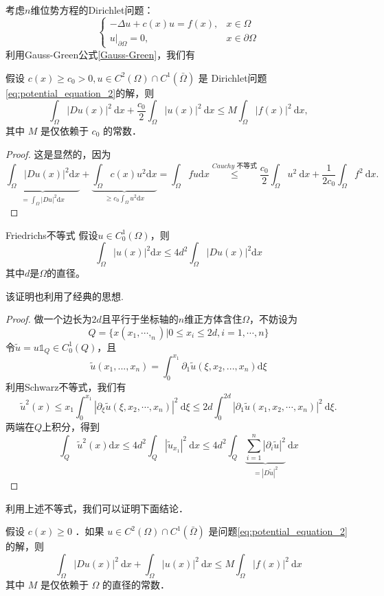 \documentclass{mynote}
\begin{document}
考虑$n$维位势方程的Dirichlet问题：
\begin{equation}\label{eq:potential_equation_2}
    \begin{cases}
        -\Delta u+c(x)u=f(x), & x\in \Omega\\
        u|_{\partial \Omega}=0, & x\in \partial \Omega
    \end{cases}
\end{equation}
利用Gauss-Green公式\ref{Gauss-Green}，我们有
\begin{theorem}
    假设 $c(x) \geq c_0>0, u \in C^2(\Omega) \cap C^1(\bar{\Omega})$ 是 Dirichlet问题\ref{eq:potential_equation_2}的解，则
$$
\int_{\Omega}|D u(x)|^2 \mathrm{~d} x+\frac{c_0}{2} \int_{\Omega}|u(x)|^2 \mathrm{~d} x \leq M \int_{\Omega}|f(x)|^2 \mathrm{~d} x,
$$
其中 $M$ 是仅依赖于 $c_0$ 的常数．
\end{theorem}
\begin{proof}
    这是显然的，因为
    \[
        \underbrace{\int_{\Omega}|Du(x)|^2\mathrm{d}x}_{=\displaystyle \int_{\Omega}|Du|^2\mathrm{d}x}+\underbrace{\int_{\Omega}c(x)u^2\mathrm{d}x}_{\displaystyle \ge c_0\int_{\Omega}u^2\mathrm{d}x}=\int_{\Omega}fu\mathrm{d}x\overset{Cauchy\text{ 不等式}}\le \frac{c_0}{2} \int_{\Omega} u^2 \mathrm{~d} x+\frac{1}{2 c_0} \int_{\Omega} f^2 \mathrm{~d} x .
    \]
\end{proof}
\begin{lemma}{Friedrichs不等式}\label{Friedrichs_inequality}
    假设$u\in C^1_0(\Omega)$，则
    \[
        \int_{\Omega}|u(x)|^2\mathrm{d}x\le 4d^2\int_\Omega|Du(x)|^2\mathrm{d}x
    \]
    其中$d$是$\Omega$的直径。
\end{lemma}
该证明也利用了经典的思想.
\begin{proof}
    做一个边长为$2d$且平行于坐标轴的$n$维正方体含住$\Omega$，不妨设为
    \[
        Q=\{x(x_1,\cdots,_n)|0\le x_i\le 2d,i=1,\cdots,n\}
    \]
    令$\tilde{u}=u \mathbb{1}_{Q}\in C_0^1(Q)$，且
    \[
        \tilde{u}(x_1,...,x_n)=\int_0^{x_1}\partial_{1}\tilde{u}(\xi,x_2,...,x_n)\mathrm{d}\xi
    \]
    利用Schwarz不等式，我们有
    \[
        \tilde{u}^2(x) \leq x_1 \int_0^{x_1}\left|\partial_\xi \tilde{u}\left(\xi, x_2, \cdots, x_n\right)\right|^2 \mathrm{~d} \xi\leq 2 d \int_0^{2 d}\left|\partial_1 \tilde{u}\left(x_1, x_2, \cdots, x_n\right)\right|^2 \mathrm{~d} \xi .
    \]
    两端在$Q$上积分，得到
    \[
        \int_Q \tilde{u}^2(x) \mathrm{d} x \leq 4 d^2 \int_Q\left|\tilde{u}_{x_1}\right|^2 \mathrm{~d} x \leq 4 d^2 \int_Q\underbrace{\sum_{i=1}^n\left|\partial_i \tilde{u}\right|^2}_{=|D \tilde{u}|^2} \mathrm{~d} x
    \]
\end{proof}
利用上述不等式，我们可以证明下面结论．
\begin{theorem}
    假设 $c(x) \geq 0$ ．如果 $u \in C^2(\Omega) \cap C^1(\bar{\Omega})$ 是问题\ref{eq:potential_equation_2}的解，则
$$
\int_{\Omega}|D u(x)|^2 \mathrm{~d} x+\int_{\Omega}|u(x)|^2 \mathrm{~d} x \leq M \int_{\Omega}|f(x)|^2 \mathrm{~d} x
$$
其中 $M$ 是仅依赖于 $\Omega$ 的直径的常数．
\end{theorem}
\end{document}
